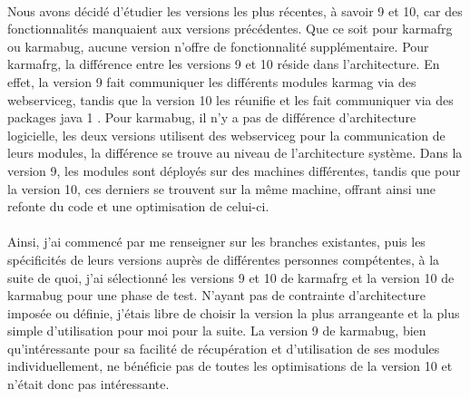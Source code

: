 \documentclass[12pt,a4paper]{report}
\begin{document}
\paragraph*{}Nous avons décidé d’étudier les versions les plus récentes, à savoir 9 et
10, car des fonctionnalités manquaient aux versions précédentes. Que ce soit pour \gls{karmafrg} ou \gls{karmabug}, aucune version n’offre de fonctionnalité supplémentaire. Pour \gls{karmafrg}, la différence entre les versions 9 et 10 réside dans l’architecture. En effet, la version 9 fait communiquer les différents modules \gls{karmag} via des \gls{webserviceg}, tandis que la version 10 les réunifie et les fait communiquer via des packages java 1 . Pour \gls{karmabug}, il n’y a pas de différence d’architecture logicielle, les deux versions utilisent des \gls{webserviceg} pour la communication de leurs modules, la différence se trouve au niveau de l’architecture système. Dans la version 9, les modules sont déployés sur des machines différentes, tandis que pour la version 10, ces derniers se trouvent sur la même machine, offrant ainsi une refonte du code et une optimisation de celui-ci.
\paragraph*{}Ainsi, j’ai commencé par me renseigner sur les branches existantes, puis
les spécificités de leurs versions auprès de différentes personnes compétentes, à la suite de quoi, j’ai sélectionné les versions 9 et 10 de \gls{karmafrg} et la version 10 de \gls{karmabug} pour une phase de test. N’ayant pas de contrainte d’architecture imposée ou définie, j’étais libre de choisir la version la plus arrangeante et la plus simple d’utilisation pour moi pour la suite. La version 9 de \gls{karmabug}, bien qu’intéressante pour sa facilité de récupération et d’utilisation de ses modules individuellement, ne bénéficie pas de toutes les optimisations de la version 10 et n’était donc pas intéressante.
\end{document}
